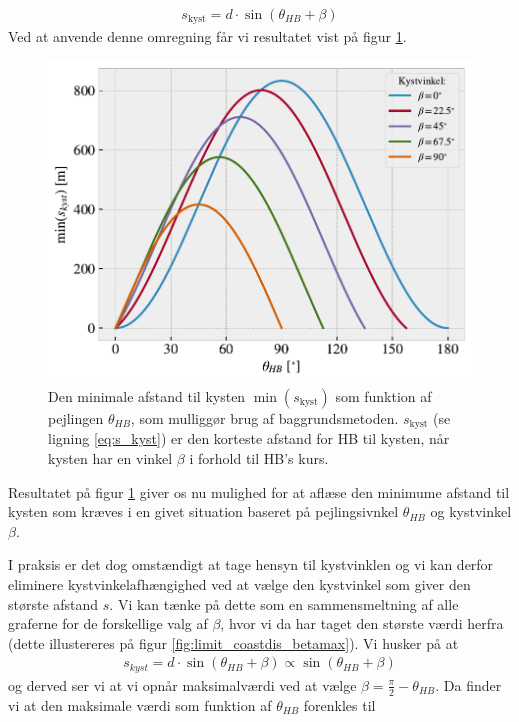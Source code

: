 \documentclass[%
 reprint,
nofootinbib,
aps,
]{revtex4-1}
\begin{document}
\begin{align}
  s_{\text{kyst}} = d\cdot \sin{(\theta_{HB} + \beta)}
  \label{eq:s_kyst}
\end{align}
Ved at anvende denne omregning får vi resultatet vist på figur \ref{fig:limit_coastdis}.
\begin{figure}[H]
  \includegraphics[width=\linewidth]{figures/limit_coastdis.pdf}
  \caption{Den minimale afstand til kysten $\min{(s_{\text{kyst}})}$ som funktion af pejlingen $\theta_{HB}$, som mulliggør brug af baggrundsmetoden. $s_{\text{kyst}}$ (se ligning \ref{eq:s_kyst}) er den korteste afstand for HB til kysten, når kysten har en vinkel $\beta$ i forhold til HB's kurs.}
  \label{fig:limit_coastdis}
\end{figure}
Resultatet på figur \ref{fig:limit_coastdis} giver os nu mulighed for at aflæse den minimume afstand til kysten som kræves i en givet situation baseret på pejlingsivnkel $\theta_{HB}$ og kystvinkel $\beta$. \par
I praksis er det dog omstændigt at tage hensyn til kystvinklen og vi kan derfor eliminere kystvinkelafhængighed ved at vælge den kystvinkel som giver den største afstand $s$. Vi kan tænke på dette som en sammensmeltning af alle graferne for de forskellige valg af $\beta$, hvor vi da har taget den største værdi herfra (dette illustereres på figur \ref{fig:limit_coastdis_betamax}). Vi husker på at
\begin{align*}
  s_{kyst} = d\cdot \sin{(\theta_{HB} + \beta)} \propto \sin{(\theta_{HB} + \beta)}
\end{align*}
og derved ser vi at vi opnår maksimalværdi ved at vælge $\beta = \frac{\pi}{2} - \theta_{HB}$. Da finder vi at den maksimale værdi som funktion af $\theta_{HB}$ forenkles til
\end{document}
